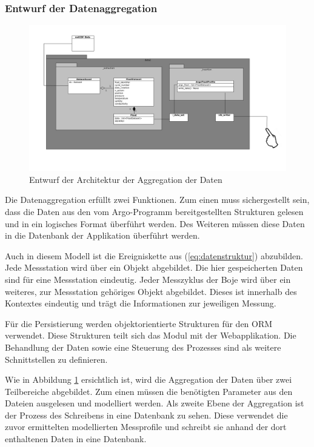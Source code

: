 \subsubsection{Entwurf der Datenaggregation}\label{sec:entwurfAggregation}
\begin{figure}[h!]
\centering
\includegraphics[width=\textwidth]{pix/grobentwurf_dataaggregation.png}
\caption{Entwurf der Architektur der Aggregation der Daten}
\label{fig:grobetwurf_architektur_datenaggregation}
\end{figure}

Die Datenaggregation erfüllt zwei Funktionen. Zum einen muss sichergestellt sein, dass die Daten aus den vom Argo-Programm bereitgestellten Strukturen gelesen und in ein logisches Format überführt werden. Des Weiteren müssen diese Daten in die Datenbank der Applikation überführt werden.

Auch in diesem Modell ist die Ereigniskette aus (\ref{eq:datenstruktur}) abzubilden. Jede Messstation wird über ein Objekt abgebildet. Die hier gespeicherten Daten sind für eine Messstation eindeutig. Jeder Messzyklus der Boje wird über ein weiteres, zur Messstation gehöriges Objekt abgebildet. Dieses ist innerhalb des Kontextes eindeutig und trägt die Informationen zur jeweiligen Messung.

Für die Persistierung  werden objektorientierte Strukturen für den \gls{ORM} verwendet. Diese Strukturen teilt sich das Modul mit der Webapplikation. Die Behandlung der Daten sowie eine Steuerung des Prozesses sind als weitere Schnittstellen zu definieren.

Wie in Abbildung \ref{fig:grobetwurf_architektur_datenaggregation} ersichtlich ist, wird die Aggregation der Daten über zwei Teilbereiche abgebildet. Zum einen müssen die benötigten Parameter aus den Dateien ausgelesen und modelliert werden.
Als zweite Ebene der Aggregation ist der Prozess des Schreibens in eine Datenbank zu sehen. Diese verwendet die zuvor ermittelten modellierten Messprofile und schreibt sie anhand der dort enthaltenen Daten in eine Datenbank.


